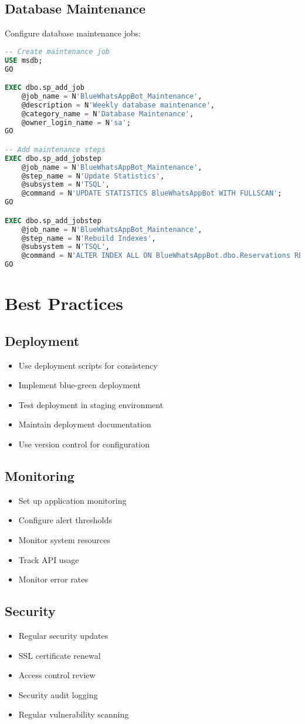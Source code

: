 \subsection{Database Maintenance}
Configure database maintenance jobs:

\begin{lstlisting}[language=sql]
-- Create maintenance job
USE msdb;
GO

EXEC dbo.sp_add_job
    @job_name = N'BlueWhatsAppBot_Maintenance',
    @description = N'Weekly database maintenance',
    @category_name = N'Database Maintenance',
    @owner_login_name = N'sa';
GO

-- Add maintenance steps
EXEC dbo.sp_add_jobstep
    @job_name = N'BlueWhatsAppBot_Maintenance',
    @step_name = N'Update Statistics',
    @subsystem = N'TSQL',
    @command = N'UPDATE STATISTICS BlueWhatsAppBot WITH FULLSCAN';
GO

EXEC dbo.sp_add_jobstep
    @job_name = N'BlueWhatsAppBot_Maintenance',
    @step_name = N'Rebuild Indexes',
    @subsystem = N'TSQL',
    @command = N'ALTER INDEX ALL ON BlueWhatsAppBot.dbo.Reservations REBUILD';
GO
\end{lstlisting}

\section{Best Practices}

\subsection{Deployment}
\begin{itemize}
    \item Use deployment scripts for consistency
    \item Implement blue-green deployment
    \item Test deployment in staging environment
    \item Maintain deployment documentation
    \item Use version control for configuration
\end{itemize}

\subsection{Monitoring}
\begin{itemize}
    \item Set up application monitoring
    \item Configure alert thresholds
    \item Monitor system resources
    \item Track API usage
    \item Monitor error rates
\end{itemize}

\subsection{Security}
\begin{itemize}
    \item Regular security updates
    \item SSL certificate renewal
    \item Access control review
    \item Security audit logging
    \item Regular vulnerability scanning
\end{itemize} 